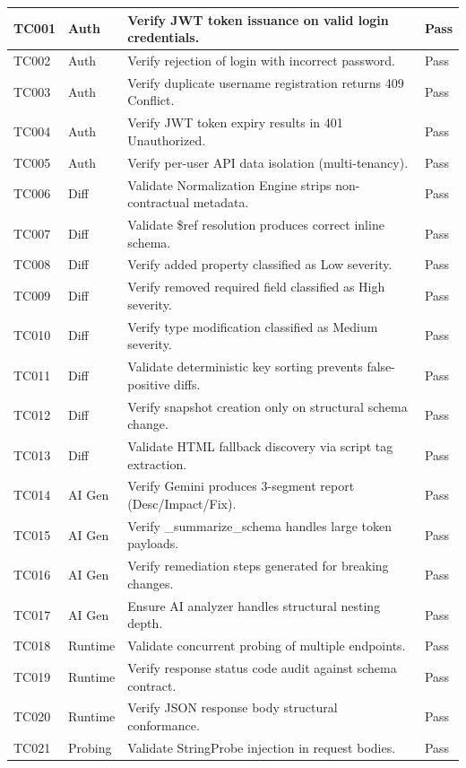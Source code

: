 \documentclass{fisatprojectfinal}
\begin{document}
\begin{longtable}{|p{2cm}|p{3cm}|p{6cm}|p{2cm}|}
TC001 & Auth & Verify JWT token issuance on valid login credentials. & Pass \\ \hline
TC002 & Auth & Verify rejection of login with incorrect password. & Pass \\ \hline
TC003 & Auth & Verify duplicate username registration returns 409 Conflict. & Pass \\ \hline
TC004 & Auth & Verify JWT token expiry results in 401 Unauthorized. & Pass \\ \hline
TC005 & Auth & Verify per-user API data isolation (multi-tenancy). & Pass \\ \hline
TC006 & Diff & Validate Normalization Engine strips non-contractual metadata. & Pass \\ \hline
TC007 & Diff & Validate \$ref resolution produces correct inline schema. & Pass \\ \hline
TC008 & Diff & Verify added property classified as Low severity. & Pass \\ \hline
TC009 & Diff & Verify removed required field classified as High severity. & Pass \\ \hline
TC010 & Diff & Verify type modification classified as Medium severity. & Pass \\ \hline
TC011 & Diff & Validate deterministic key sorting prevents false-positive diffs. & Pass \\ \hline
TC012 & Diff & Verify snapshot creation only on structural schema change. & Pass \\ \hline
TC013 & Diff & Validate HTML fallback discovery via script tag extraction. & Pass \\ \hline
TC014 & AI Gen & Verify Gemini produces 3-segment report (Desc/Impact/Fix). & Pass \\ \hline
TC015 & AI Gen & Verify \_summarize\_schema handles large token payloads. & Pass \\ \hline
TC016 & AI Gen & Verify remediation steps generated for breaking changes. & Pass \\ \hline
TC017 & AI Gen & Ensure AI analyzer handles structural nesting depth. & Pass \\ \hline
TC018 & Runtime & Validate concurrent probing of multiple endpoints. & Pass \\ \hline
TC019 & Runtime & Verify response status code audit against schema contract. & Pass \\ \hline
TC020 & Runtime & Verify JSON response body structural conformance. & Pass \\ \hline
TC021 & Probing & Validate StringProbe injection in request bodies. & Pass \\ \hline

\end{longtable}
\end{document}
